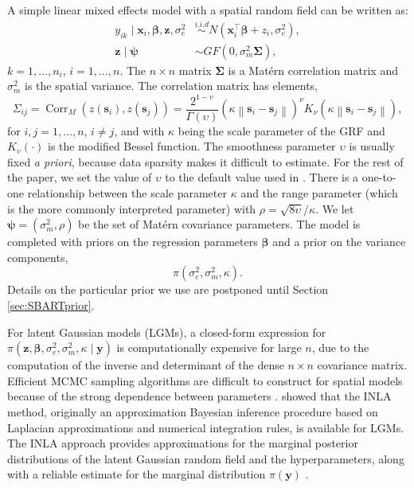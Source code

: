 \documentclass[preprint,12pt,authoryear]{elsarticle}
\begin{document}
A simple linear mixed effects model with a spatial random field can be written as: %
{
\begin{align} 
y_{ik} \mid \boldsymbol{x}_{i}, \boldsymbol{\beta},  \boldsymbol{z}, \sigma_e^2 &\stackrel{i.i.d}{\sim} N\left(\boldsymbol{x}_i^{\top}\boldsymbol{\beta} +z_i, \sigma_e^2\right), \label{eq:model0} \\ 
\boldsymbol{z} \mid \boldsymbol{\psi}  &\sim G F(0, \sigma_m^2  \boldsymbol{\Sigma}),
\label{eq:model}
\end{align}
$k=1,\dots,n_i$, $i=1,\dots,n$.
The  
$n \times n$ matrix $\mathbf{\Sigma}$ is a Mat\'ern correlation matrix and $\sigma_m^2$ is the spatial variance. The correlation matrix has elements,
\begin{equation} 	
\Sigma_{i j} =\operatorname{Corr}_M\left(z\left(\boldsymbol{s}_i\right), z\left(\boldsymbol{s}_j\right)\right)=\frac{2^{1-\upsilon} }{\Gamma(\upsilon)}\left(\kappa\left\|\boldsymbol{s}_i-\boldsymbol{s}_j\right\|\right)^\nu K_\nu\left(\kappa\left\|\boldsymbol{s}_i-\boldsymbol{s}_j\right\|\right),
\label{eq:matern}
\end{equation} 
for $i,j=1,\dots,n$, $i \neq j$, and 
with $\kappa$ being the scale parameter of the GRF and $K_\upsilon(\cdot)$ is the modified Bessel function. The smoothness parameter $\upsilon$ is usually fixed \textit{a priori}, because data sparsity makes it difficult to estimate. {For the rest of the paper, we set the value of $\upsilon$ to the default value used in \citep{lindgren2011explicit}.} There is a one-to-one relationship between the scale parameter $\kappa$ and the range parameter (which is the more commonly interpreted parameter) with $\rho=\sqrt{ 8 \upsilon}/\kappa$. We let $\boldsymbol{\psi} = (\sigma_m^2, \rho)$ be the set of Mat\'ern covariance parameters.}  The model is completed with priors on the regression parameters $\boldsymbol{\beta}$ and a prior on the variance components,
\begin{equation}\label{eq:varprior}
\pi( \sigma_e^2,\sigma_m^2,\kappa).
\end{equation}
Details on the particular prior we use are postponed until Section \ref{sec:SBARTprior}.

For latent Gaussian models (LGMs), a closed-form expression for $\pi(\boldsymbol{z}, \boldsymbol{\beta}, \sigma_e^2, \sigma_m^2, \kappa \mid \boldsymbol{y})$ is computationally expensive for large $n$, due to the computation of the inverse and determinant of the dense $n \times n$ covariance matrix. Efficient MCMC sampling algorithms are difficult to construct for spatial models because of the strong dependence between parameters \citep{knorr2002block}. \cite{rue2009approximate} showed that the INLA method, originally an approximation Bayesian inference procedure based on Laplacian approximations and numerical integration rules, is available for LGMs. The INLA approach provides approximations for the marginal posterior distributions of the latent Gaussian random field and the hyperparameters, along with a reliable estimate for the marginal distribution $\pi(\boldsymbol{y})$ \citep{hubin2016estimating}.
\end{document}
